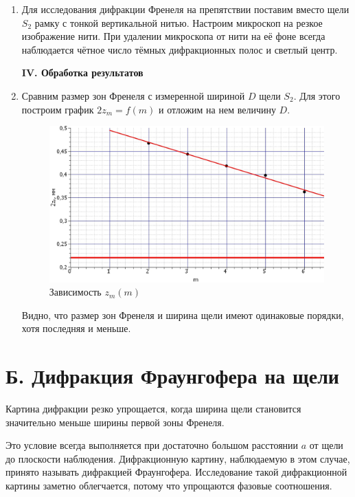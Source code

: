 \documentclass[a4paper,12pt]{article} %
\begin{document}
\begin{enumerate}
		\item Для исследования дифракции Френеля на препятствии поставим вместо щели $S_2$ рамку с тонкой вертикальной нитью. Настроим микроскоп на резкое изображение нити. При удалении микроскопа от нити на её фоне всегда наблюдается чётное число тёмных дифракционных полос и светлый центр.
		
		
		
		\begin{center}
			\textbf{IV. Обработка результатов}
		\end{center}
		
		\item Сравним размер зон Френеля с измеренной шириной $D$ щели $S_2$. Для этого  построим график $2z_m = f(m)$ и отложим на нем величину $D$.
		\begin{figure}[h!]
			\centering
			\includegraphics[scale=0.65]{Pictures/z(m)}
			\caption{Зависимость $z_m(m)$}
		\end{figure}
		
		Видно, что размер зон Френеля и ширина щели имеют одинаковые порядки, хотя последняя и меньше.
	\end{enumerate}
	
	\section*{Б. Дифракция Фраунгофера на щели}
	
	Картина дифракции резко упрощается, когда ширина щели становится значительно меньше ширины первой зоны Френеля. 
	
	Это условие всегда выполняется при достаточно большом расстоянии $a$ от щели до плоскости наблюдения. Дифракционную картину, наблюдаемую в этом случае, принято называть дифракцией Фраунгофера. Исследование такой дифракционной картины заметно облегчается, потому что упрощаются фазовые соотношения.
	
\end{document}
